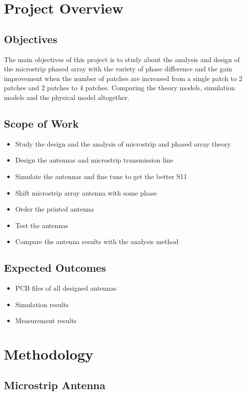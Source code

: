 \documentclass[11pt,a4paper]{article}
\begin{document}
\newpage

\section{Project Overview}
\subsection{Objectives}
The main objectives of this project is to study about the analysis and design of the microstrip phased array with the variety of phase difference and the gain improvement when the number of patches are increased from a single patch to 2 patches and 2 patches to 4 patches. Comparing the theory models, simulation models and the physical model altogether.
\subsection{Scope of Work}
\begin{itemize}
	\item Study the design and the analysis of microstrip and phased array theory
	\item Design the antennas and microstrip transmission line
	\item Simulate the antennas and fine tune to get the better S11
    \item Shift microstrip array antenna with some phase
	\item Order the printed antenna
    \item Test the antennas
	\item Compare the antenna results with the analysis method
\end{itemize}
\subsection{Expected Outcomes}
\begin{itemize}
	\item PCB files of all designed antennas
	\item Simulation results
    \item Measurement results
\end{itemize}

\newpage

\section{Methodology}
\subsection{Microstrip Antenna}
\end{document}
